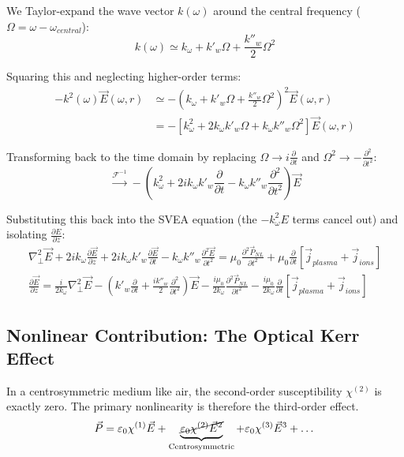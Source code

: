 \documentclass[11pt,a4paper]{article}
\begin{document}
We Taylor-expand the wave vector $k(\omega)$ around the central frequency ($\Omega = \omega - \omega_{central}$):
\begin{equation*}
k(\omega) \simeq k_{\omega} + k'_w \Omega + \frac{k''_w}{2} \Omega^2
\end{equation*}

Squaring this and neglecting higher-order terms:
\begin{align}
-k^2(\omega) \vec{E}(\omega, r) &\simeq -\left( k_{\omega} + k'_w \Omega + \frac{k''_w}{2} \Omega^2 \right)^2 \vec{E}(\omega, r) \nonumber \\
&= -\left[ k_{\omega}^2 + 2 k_{\omega} k'_w \Omega + k_{\omega} k''_w \Omega^2 \right] \vec{E}(\omega, r)
\end{align}

Transforming back to the time domain by replacing $\Omega \rightarrow i \frac{\partial}{\partial t}$ and $\Omega^2 \rightarrow -\frac{\partial^2}{\partial t^2}$:
\begin{equation}
\xrightarrow{\mathcal{F}^{-1}} -\left(k_{\omega}^2 + 2 i k_{\omega} k'_w \frac{\partial }{\partial t} - k_{\omega} k''_w \frac{\partial^2 }{\partial t^2} \right) \vec{E}
\end{equation}

Substituting this back into the SVEA equation (the $-k_{\omega}^2 E$ terms cancel out) and isolating $\frac{\partial E}{\partial z}$:
\begin{align}
\nabla_\perp^2 \vec{E} + 2 i k_{\omega} \frac{\partial \vec{E}}{\partial z} + 2 i k_{\omega} k'_w \frac{\partial \vec{E}}{\partial t} - k_{\omega} k''_w \frac{\partial^2 \vec{E}}{\partial t^2} = \mu_0 \frac{\partial^2 \vec{P}_{NL}}{\partial t^2} + \mu_0 \frac{\partial}{\partial t} [\vec{j}_{plasma} + \vec{j}_{ions}] \nonumber \\
\frac{\partial \vec{E}}{\partial z} = \frac{i}{2 k_{\omega}} \nabla_\perp^2 \vec{E} - \left( k'_w \frac{\partial}{\partial t} + \frac{i k''_w}{2} \frac{\partial^2}{\partial t^2} \right)\vec{E} - \frac{i \mu_0}{2 k_{\omega}} \frac{\partial^2 \vec{P}_{NL}}{\partial t^2} - \frac{i \mu_0}{2 k_{\omega}} \frac{\partial}{\partial t} [\vec{j}_{plasma} + \vec{j}_{ions}]
\end{align}

\subsection*{Nonlinear Contribution: The Optical Kerr Effect}
In a centrosymmetric medium like air, the second-order susceptibility $\chi^{(2)}$ is exactly zero. The primary nonlinearity is therefore the third-order effect.
\begin{equation*}
\vec{P} = \varepsilon_0 \chi^{(1)}\vec{E}  + \underbrace{\cancel{\varepsilon_0 \chi^{(2)} \vec{E}^2}}_{\text{Centrosymmetric}} + \varepsilon_0 \chi^{(3)} \vec{E}^3 + \dots
\end{equation*}
\end{document}

